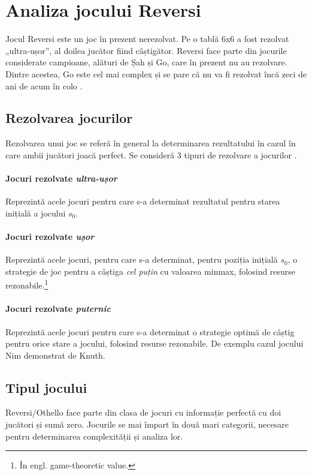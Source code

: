 \documentclass[12pt,twoside,a4paper,fleqn]{book}
\begin{document}
\chapter{Analiza jocului Reversi}
Jocul Reversi este un joc în prezent nerezolvat. Pe o tablă 6x6 a fost rezolvat „ultra-ușor”, al doilea jucător fiind câștigător. Reversi face parte din jocurile considerate campioane, alături de Șah și Go, care în prezent nu au rezolvare. Dintre acestea, Go este cel mai complex și se pare că nu va fi rezolvat încă zeci de ani de acum în colo \cite{allis, games_solved_herik}.

\section{Rezolvarea jocurilor}
Rezolvarea unui joc se referă în general la determinarea rezultatului în cazul în care ambii jucători joacă perfect.
Se consideră 3 tipuri de rezolvare a jocurilor \cite{allis, games_solved_herik}. 
\subsubsection{Jocuri rezolvate \emph{ultra-ușor}}
Reprezintă acele jocuri pentru care s-a determinat rezultatul pentru starea inițială a jocului $s_{0}$.
\subsubsection{Jocuri rezolvate \emph{ușor}}
Reprezintă acele jocuri, pentru care s-a determinat, pentru poziția inițială $s_{0}$, o strategie de joc pentru a câștiga \emph{cel puțin} cu valoarea minmax, folosind resurse rezonabile.\footnote{În engl. game-theoretic value.}
\subsubsection{Jocuri rezolvate \emph{puternic}}
Reprezintă acele jocuri pentru care s-a determinat o strategie optimă de câștig pentru orice stare a jocului, folosind resurse rezonabile. De exemplu cazul jocului Nim demonstrat de Knuth.

\section{Tipul jocului}
Reversi/Othello face parte din clasa de jocuri cu informație perfectă cu doi jucători și sumă zero. Jocurile se mai împart în două mari categorii, necesare pentru determinarea complexității și analiza lor.
\end{document}
